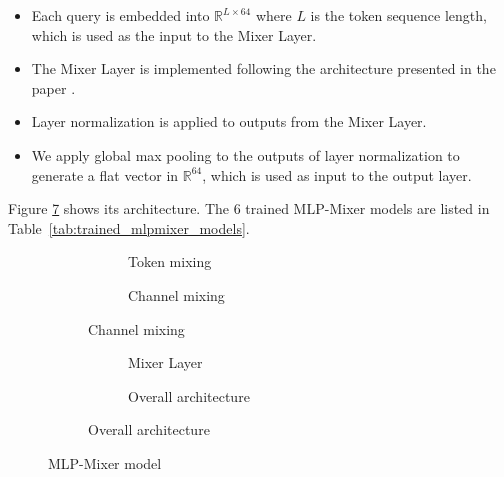\begin{itemize}
	\item Each query is embedded into $\mathbb{R}^{L\times 64}$ where $L$ is the token sequence length, which is used as the input to the Mixer Layer.
	\item The Mixer Layer is implemented following the architecture presented in the paper \cite{DBLP:journals/corr/abs-2105-01601}.
	\item Layer normalization is applied to outputs from the Mixer Layer.
	\item We apply global max pooling to the outputs of layer normalization to generate a flat vector in $\mathbb{R}^{64}$, which is used as input to the output layer.
\end{itemize}
Figure \ref{fig:mlpmixer_model_all} shows its architecture. The 6 trained MLP-Mixer models are listed in Table~\ref{tab:trained_mlpmixer_models}.
\begin{figure}[p]
	\centering
	\begin{subfigure}{\textwidth}
		\begin{subfigure}[t]{0.45\textwidth}
			\centering
			
			\caption{Token mixing}
			\label{fig:mlpmixer_model_token_mixing}
		\end{subfigure}
		\hfill
		\begin{subfigure}[t]{0.45\textwidth}
			\centering
			
			\caption{Channel mixing}
			\label{fig:mlpmixer_model_channel_mixing}
		\end{subfigure}
	\end{subfigure}
	\vfill
	\begin{subfigure}{\textwidth}
		\begin{subfigure}[b]{0.4\textwidth}
			\centering
			
			\caption{Mixer Layer}
			\label{fig:mlpmixer_model_mixer}
		\end{subfigure}
		\hfill
		\begin{subfigure}[b]{0.4\textwidth}
			\centering
			
			\caption{Overall architecture}
			\label{fig:mlpmixer_model}
		\end{subfigure}
	\end{subfigure}
	\caption{MLP-Mixer model}
	\label{fig:mlpmixer_model_all}
\end{figure}
